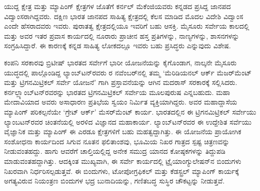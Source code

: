 ಯುದ್ದ ಕ್ಷೇತ್ರ ಮತ್ತು ಮ್ಯಾಪಿಂಗ್​ ಕ್ಷೇತ್ರಗಳ ಜೊತೆಗೆ ಕರ್ನಲ್​ ಮೆಕೆಂಜಿಯವರು ಕನ್ನಡದ ಪ್ರಸಿದ್ದ ಜಾನಪದ ವಿದ್ವಾಂಸರಾಗಿದ್ದವರು. ದಕ್ಷಿಣ ಭಾರತ ಜಾನಪದ ಸಾಹಿತ್ಯ ಕ್ಷೇತ್ರದಲ್ಲಿ ಕೆಲಸ ಮಾಡಿದ ಮೊದಲ ವಿದೇಶಿ ವಿದ್ವಾಂಸ ಎಂದೇ ಹೆಸರಾದವರು ಇವರು. ಪುರಾತತ್ವ ಕ್ಷೇತ್ರದಲ್ಲಿಯೂ ಇವರಿಗೆ ಬಹು ಆಸಕ್ತಿ. ಮೈಸೂರು ಸರ್ವೇಯ ಕಾಲದಲ್ಲಿ ಮತ್ತು ಅವರ ಇತರ ಪ್ರವಾಸ ಕಾರ್ಯದಲ್ಲಿ ನೂರಾರು ಪ್ರಾಚೀನ ಹಸ್ತ ಪ್ರತಿಗಳನ್ನು, ನಾಣ್ಯಗಳನ್ನು, ಶಾಸನಗಳನ್ನು ಸಂಗ್ರಹಿಸಿದ್ದಾರೆ. ಈ ಕಾರಣಕ್ಕೆ ಕನ್ನಡ ಸಾಹಿತ್ಯ ಲೋಕದಲ್ಲೂ ಇವರು ಬಹು ಪ್ರಸಿದ್ಧರು ಎನ್ನುವುದು ವಿಶೇಷ.

ಕಂಪನಿ ಸರಕಾರವು ಬ್ರಿಟೀಷ್​ ಭಾರತದ ಸರ್ವೇಗೆ ಭಾರೀ ಯೋಜನೆಯನ್ನು ಕೈಗೊಂಡಾಗ, ನಾಲ್ಕನೇ ಮೈಸೂರು ಯುದ್ಧದಲ್ಲಿ ಪಾಲ್ಗೊಂಡಿದ್ದ ಲ್ಯಾಂಬ್​ಟನ್​ರವರು ರ ನವೆಂಬರ್​\break ನಲ್ಲಿ ತಮ್ಮ ‘ಮೆರಿಡಿಯನಲ್​ ಆರ್ಕ್ ಮೆಜರ್​ಮೆಂಟ್​ ಮತ್ತು ಟ್ರಿಗನಮಿಟ್ರಿಕಲ್​ ಸರ್ವೇ ಯೋಜನೆ’ ಗಾಗಿ ಪ್ರಸ್ತಾವನೆಯನ್ನು ಆಗಿನ ಮದರಾಸ್​ ಸರಕಾರಕ್ಕೆ ಸಲ್ಲಿಸಿದರು. ಕರ್ನಲ್\break ಲ್ಯಾಂಬ್​ಟನ್​ರವರನ್ನು ಭಾರತದ ಟ್ರಿಗನಮಿಟ್ರಿಕಲ್​ ಸರ್ವೇಯ ಮೂಲಪುರುಷ ಎನ್ನಬಹುದು. ಮಹಾ ಮೇದಾವಿಯಾದ ಅವರು ಅಸಾಧಾರಣ ಪ್ರತಿಭೆಯ ಸ್ವಯಂ ನಿರ್ಮಿತ ವ್ಯಕ್ತಿಯಾಗಿದ್ದರು. ಅವರ ಮಹಾದ್ದಾಸೆಯ ಮ್ಯಾಪಿಂಗ್​ ಪರಿಕಲ್ಪನೆಯೇ ‘ಗ್ರೇಟ್​ ಆರ್ಕ್’ ಮೆಸರ್​\break ಮೆಂಟ್​ ಕಾರ್ಯ. ಭಾರತದಲ್ಲಿನ ಈ ಟ್ರಿಗನಮಿಟ್ರಿಕಲ್​ ಸರ್ವೇಯು ಲ್ಯಾಂಬಟನ್​ರವರ ಚಿಂತನೆಯಲ್ಲಿ ಅರಳಿದ ವಿಜ್ಞಾನದ ಮಹಾಕಾರ್ಯ. ಲ್ಯಾಂಬ್​ಟನ್​ರವರ ಈ ಉದ್ದೇಶಿತ ಸರ್ವೆಯು ವೈಜ್ಞಾನಿಕ ಮತ್ತು ಮ್ಯಾಪಿಂಗ್​ ಈ ಎರಡೂ ಕ್ಷೇತ್ರಗಳಿಗೆ ಬಹು ಮಹತ್ವದ್ದಾಗಿತ್ತು. ಈ ಯೋಜನೆಯ ಪ್ರಾಯೋಗಿಕ ಸಂಶೋಧನಾ ಕಾರ್ಯದಿಂದ ಸಿಗುವ ನೂತನ ಫಲಿತಾಂಶವು, ಭೂಮಿಯ ನಿಖರ ಗಾತ್ರದ ಸ್ಪಷ್ಟ ಚಿತ್ರಣವನ್ನು ನೀಡುವಂತಹದ್ದು. ಹಾಗು ಆವರೆಗೆ ಚಾಲ್ತಿಯಲ್ಲಿದ್ದ ಅನೇಕ ಸಮುದ್ರ ಯಾನದ ಕೋಷ್ಠಕಗಳನ್ನು ತಿದ್ದುಪಡಿ ಮಾಡುವಂತಹದ್ದಾಗಿತ್ತು. ಆದಕ್ಕಿಂತ ಮುಖ್ಯವಾಗಿ, ಈ ಸರ್ವೇ ಕಾರ್ಯದಲ್ಲಿ ಟ್ರೈಯಾಂಗ್ಯುಲೇಷನ್​ನ ಬಿಂದುಗಳು ನಿಖರವಾಗಿ ನಿರ್ಧರಿಸಲ್ಪಡುತ್ತವೆ. ಈ ಬಿಂದುಗಳು, ಟೋಪೋಗ್ರಫಿಕಲ್​ ಮತ್ತು ಕೆಡಸ್ಟ್ರಲ್​ ಮ್ಯಾಪಿಂಗ್​ ಕಾರ್ಯಕ್ಕೆ ಅಗತ್ಯವಿರುವ ನಿಯಂತ್ರಣ ಬಿಂದುಗಳ ಭದ್ರ ಬುನಾದಿಯನ್ನು, ಗಣಿತಬದ್ಧ ಸುಸ್ಥಿರ ಚೌಕಟ್ಟನ್ನು ನೀಡುತ್ತವೆ.

